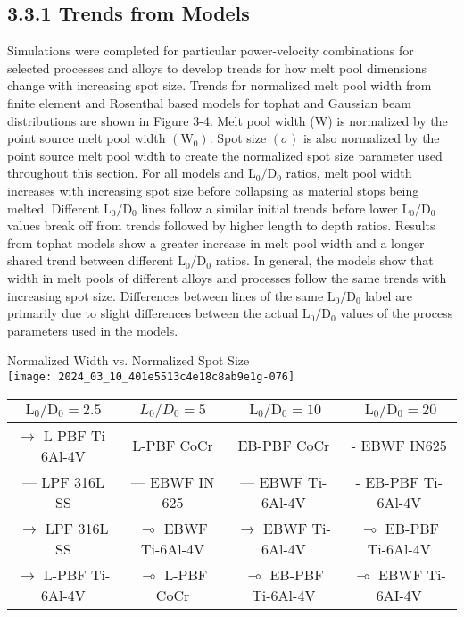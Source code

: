 \documentclass[10pt]{article}
\begin{document}
\subsection*{3.3.1 Trends from Models}
Simulations were completed for particular power-velocity combinations for selected processes and alloys to develop trends for how melt pool dimensions change with increasing spot size. Trends for normalized melt pool width from finite element and Rosenthal based models for tophat and Gaussian beam distributions are shown in Figure 3-4. Melt pool width (W) is normalized by the point source melt pool width $\left(\mathrm{W}_{0}\right)$. Spot size $(\sigma)$ is also normalized by the point source melt pool width to create the normalized spot size parameter used throughout this section. For all models and $\mathrm{L}_{0} / \mathrm{D}_{0}$ ratios, melt pool width increases with increasing spot size before collapsing as material stops being melted. Different $\mathrm{L}_{0} / \mathrm{D}_{0}$ lines follow a similar initial trends before lower $\mathrm{L}_{0} / \mathrm{D}_{0}$ values break off from trends followed by higher length to depth ratios. Results from tophat models show a greater increase in melt pool width and a longer shared trend between different $\mathrm{L}_{0} / \mathrm{D}_{0}$ ratios. In general, the models show that width in melt pools of different alloys and processes follow the same trends with increasing spot size. Differences between lines of the same $\mathrm{L}_{0} / \mathrm{D}_{0}$ label are primarily due to slight differences between the actual $\mathrm{L}_{0} / \mathrm{D}_{0}$ values of the process parameters used in the models.

Normalized Width vs. Normalized Spot Size\\
\texttt{[image: 2024\_03\_10\_401e5513c4e18c8ab9e1g-076]}

\begin{center}
\begin{tabular}{|c|c|c|c|}
\hline
$\mathrm{L}_{0} / \mathrm{D}_{0}=2.5$ & $L_{0} / D_{0}=5$ & $\mathrm{~L}_{0} / \mathrm{D}_{0}=10$ & $\mathrm{~L}_{0} / \mathrm{D}_{0}=20$ \\
\hline
$\longrightarrow$ L-PBF Ti-6Al-4V & L-PBF CoCr & EB-PBF CoCr & - EBWF IN625 \\
\hline
— LPF 316L SS & — EBWF IN 625 & — EBWF Ti-6Al-4V & - EB-PBF Ti-6Al-4V \\
\hline
$\longrightarrow$ LPF 316L SS & $\multimap$ EBWF Ti-6Al-4V & $\longrightarrow$ EBWF Ti-6Al-4V & $\multimap$ EB-PBF Ti-6Al-4V \\
\hline
$\rightarrow$ L-PBF Ti-6Al-4V & $\multimap$ L-PBF CoCr & $\multimap$ EB-PBF Ti-6Al-4V & $\multimap$ EBWF Ti-6AI-4V \\
\hline
\end{tabular}
\end{center}
\end{document}

